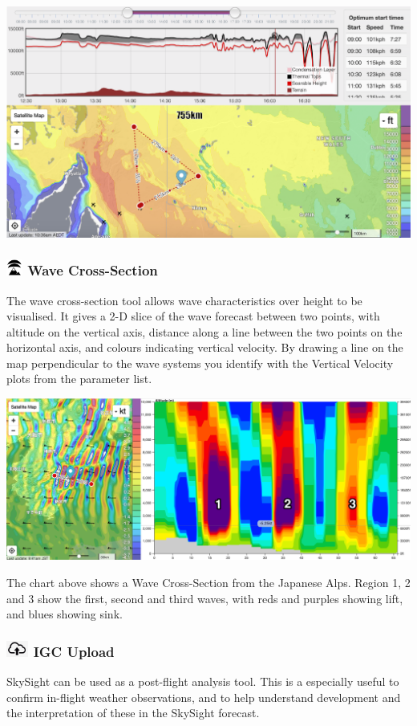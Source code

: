 \documentclass[9pt,a4paper,twocolumn]{article}
\begin{document}
\includegraphics[width=\linewidth]{images/route.png}
\subsubsection*{\includegraphics[height=15pt]{images/icons/wave.png} Wave Cross-Section}
The wave cross-section tool allows wave characteristics over height to be visualised. It gives a 2-D slice of the wave forecast between two points, with altitude on the vertical axis, distance along a line between the two points on the horizontal axis, and colours indicating vertical velocity. By drawing a line on the map perpendicular to the wave systems you identify with the Vertical Velocity plots from the parameter list.

\includegraphics[width=\linewidth]{images/wave_x-section.png}

The chart above shows a Wave Cross-Section from the Japanese Alps. Region 1, 2 and 3 show the first, second and third waves, with reds and purples showing lift, and blues showing sink.

\subsubsection*{\includegraphics[height=15pt]{images/icons/igc.png} IGC Upload}
SkySight can be used as a post-flight analysis tool. This is a especially useful to confirm in-flight weather observations, and to help understand development and the interpretation of these in the SkySight forecast.
\end{document}
